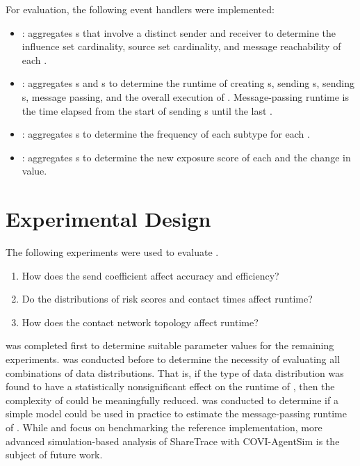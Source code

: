 For evaluation, the following event handlers were implemented:

\begin{itemize}
  \item {}: aggregates s that involve a distinct sender and receiver to determine the influence set cardinality, source set cardinality, and message reachability of each .
  \item {}: aggregates s and s to determine the runtime of creating s, sending s, sending s, message passing, and the overall execution of . Message-passing runtime is the time elapsed from the start of sending s until the last .
  \item {}: aggregates s to determine the frequency of each subtype for each .
  \item {}: aggregates s to determine the new exposure score of each  and the change in value.
\end{itemize}

\section{Experimental Design}

The following experiments were used to evaluate .
\begin{enumerate}[ref={Experiment \arabic*}]
  \item How does the send coefficient affect accuracy and efficiency?\label{item:parameters}
  \item Do the distributions of risk scores and contact times affect runtime?\label{item:distributions}
  \item How does the contact network topology affect runtime?\label{item:topology}
\end{enumerate}

 was completed first to determine suitable parameter values for the remaining experiments.  was conducted before  to determine the necessity of evaluating all combinations of data distributions. That is, if the type of data distribution was found to have a statistically nonsignificant effect on the runtime of , then the complexity of  could be meaningfully reduced.  was conducted to determine if a simple model could be used in practice to estimate the message-passing runtime of . While  and  focus on benchmarking the reference implementation, more advanced simulation-based analysis of ShareTrace with COVI-AgentSim \citep{Gupta2020} is the subject of future work.

